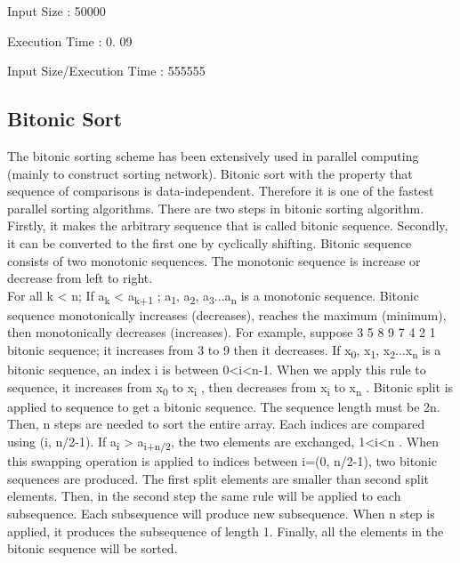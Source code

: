 \documentclass[conference]{IEEEtran}
\begin{document}
Input Size : 50000

Execution Time : 0. 09

Input Size/Execution Time : 555555

\subsection{Bitonic Sort}
The bitonic sorting scheme has been extensively used in
parallel computing (mainly to construct sorting network).
Bitonic sort with the property that sequence of comparisons is
data-independent. Therefore it is one of the fastest parallel
sorting algorithms. There are two steps in bitonic sorting
algorithm. Firstly, it makes the arbitrary sequence that is
called bitonic sequence. Secondly, it can be converted to the
first one by cyclically shifting. Bitonic sequence consists
of two monotonic sequences. The monotonic sequence is
increase or decrease from left to right.\\

For all k < n; If a\textsubscript{k} < a\textsubscript{k+1} ; a\textsubscript{1}, a\textsubscript{2}, a\textsubscript{3}...a\textsubscript{n} is a monotonic
sequence. Bitonic sequence monotonically increases
(decreases), reaches the maximum (minimum), then
monotonically decreases (increases). For example, suppose 3
5 8 9 7 4 2 1 bitonic sequence; it increases from 3 to 9 then it
decreases. If x\textsubscript{0}, x\textsubscript{1}, x\textsubscript{2}...x\textsubscript{n} is a bitonic sequence, an index i is
between 0<i<n-1. When we apply this rule to sequence, it
increases from x\textsubscript{0} to x\textsubscript{i} , then decreases from x\textsubscript{i} to x\textsubscript{n} . Bitonic
split is applied to sequence to get a bitonic sequence. The
sequence length must be 2n. Then, n steps are needed to sort
the entire array. Each indices are compared using (i, n/2-1). If
a\textsubscript{i} > a\textsubscript{i+n/2}, the two elements are exchanged, 1<i<n . When
this swapping operation is applied to indices between i=(0,
n/2-1), two bitonic sequences are produced. The first split
elements are smaller than second split elements. Then, in the second step the same rule will be applied to
each subsequence. Each subsequence will produce new
subsequence. When n step is applied, it produces the
subsequence of length 1. Finally, all the elements in the
bitonic sequence will be sorted.\\
\end{document}
